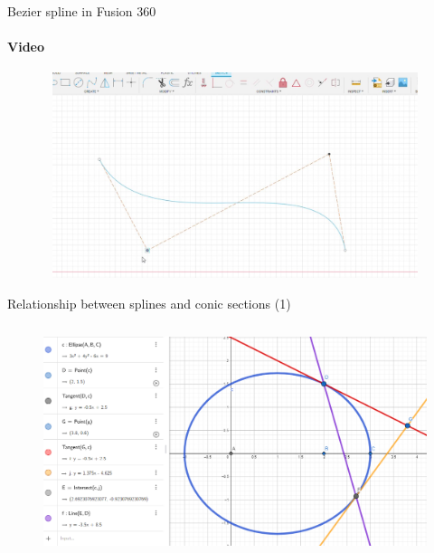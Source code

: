\documentclass[aspectratio=169]{beamer}
\begin{document}
\begin{frame}[t]{Bezier spline in Fusion 360}
    \framesubtitle{Video}
    \vspace{-0.6cm}
    \begin{figure}[H]
        \href{run:./videos/bezier_spline_video.mp4}{
            \centering\includegraphics[height=6cm,width=1\textwidth,keepaspectratio]{bezier_spline_video_preview.jpg}}
    \end{figure}
\end{frame}

\begin{frame}[t]{Relationship between splines and conic sections (1)}
\framesubtitle{}
\vspace{-0.5cm}
            \begin{figure}[H]
                \centering\includegraphics[height=6.5cm,width=1\textwidth,keepaspectratio]{bezier_to_conic_intro.png}
                \label{fig:bezier_to_conic_intro.png}
            \end{figure}
\end{frame}
\end{document}
